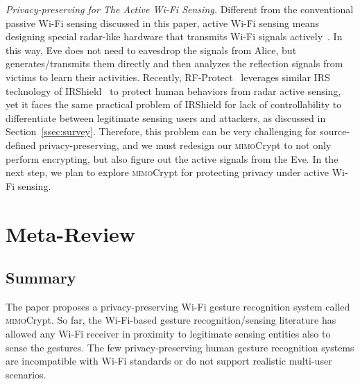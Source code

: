 \documentclass[conference,compsoc]{IEEEtran}
\newcommand{\sname}{\textsc{mimo}Crypt\xspace}
\newcommand{\newrev}[1]{{\color{blue}#1}}    %
\newcommand{\newrev}[1]{#1}
\begin{document}


\vspace{1ex}
\noindent\emph{Privacy-preserving for The Active Wi-Fi Sensing.}
Different from the conventional passive Wi-Fi sensing discussed in this paper, active Wi-Fi sensing means designing special radar-like hardware that transmits Wi-Fi signals actively~\cite{Octopus-MobiCom21, isacot}. In this way, Eve does not need to eavesdrop the signals from Alice, but generates/transmits them directly and then analyzes the reflection signals from victims to learn their activities. \newrev{Recently, RF-Protect~\cite{shenoy2022rf} leverages similar IRS technology of IRShield~\cite{IRShield-SP22} to protect human behaviors from radar active sensing, yet it faces the same practical problem of IRShield for lack of controllability to differentiate between legitimate sensing users and attackers, as discussed in Section~\ref{ssec:survey}.} Therefore, this problem can be very challenging for source-defined privacy-preserving, and we must redesign our \sname to not only perform encrypting, but also figure out the active signals from the Eve. In the next step, we plan to explore \sname for protecting privacy under active Wi-Fi sensing. 

\newpage

\section*{Meta-Review}

\subsection*{Summary}
%
The paper proposes a privacy-preserving Wi-Fi gesture recognition system called \sname. So far, the Wi-Fi-based gesture recognition/sensing literature has allowed any Wi-Fi receiver in proximity to legitimate sensing entities also to sense the gestures. The few privacy-preserving human gesture recognition systems are incompatible with Wi-Fi standards or do not support realistic multi-user scenarios.
\end{document}
